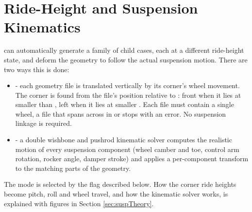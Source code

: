 \section{Ride-Height and Suspension Kinematics}
 can automatically generate a family of child cases, each at a different ride-height state, and deform the geometry to follow the actual suspension motion. There are two ways this is done:
\begin{itemize}
    \item {} - each  geometry file is translated vertically by its corner's wheel movement. The corner is found from the file's position relative to : front when it lies at smaller  than , left when it lies at smaller . Each  file must contain a single wheel, a file that spans across  in  or  stops  with an error. No suspension linkage is required.

    \item {} - a double wishbone and pushrod kinematic solver computes the realistic motion of every suspension component (wheel camber and toe, control arm rotation, rocker angle, damper stroke) and applies a per-component transform to the matching parts of the geometry.
\end{itemize}
The mode is selected by the  flag described below. How the corner ride heights become pitch, roll and wheel travel, and how the kinematic solver works, is explained with figures in Section \ref{sec:suspTheory}.


